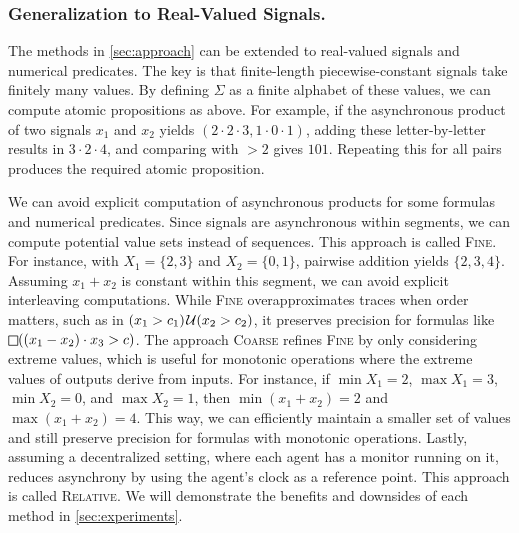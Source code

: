 \vspace{-1em}
\subsubsection{Generalization to Real-Valued Signals.}
The methods in \cref{sec:approach} can be extended to real-valued signals and numerical predicates.
The key is that finite-length piecewise-constant signals take finitely many values.
By defining $\Sigma$ as a finite alphabet of these values, we can compute atomic propositions as above.
For example, if the asynchronous product of two signals $x_1$ and $x_2$ yields $(2\cdot2\cdot3, 1\cdot0\cdot1)$, adding these letter-by-letter results in $3 \cdot 2 \cdot 4$, and comparing with $> 2$ gives $101$. Repeating this for all pairs produces the required atomic proposition.

We can avoid explicit computation of asynchronous products for some formulas and numerical predicates.
Since signals are asynchronous within segments, we can compute potential value sets instead of sequences.
This approach is called \textsc{Fine}.
For instance, with $X_1 = \{2,3\}$ and $X_2 = \{0,1\}$, pairwise addition yields $\{2, 3, 4\}$.
Assuming $x_1 + x_2$ is constant within this segment, we can avoid explicit interleaving computations.
While \textsc{Fine} overapproximates traces when order matters, such as in $(x_1 > c_1) \kern.1em\mathcal{U} (x_2 > c_2)$, it preserves precision for formulas like $\LTLalways((x_1 - x_2) \cdot x_3 > c)$.
The approach \textsc{Coarse} refines \textsc{Fine} by only considering extreme values, which is useful for monotonic operations where the extreme values of outputs derive from inputs.
For instance, if $\min X_1 = 2$, $\max X_1 = 3$, $\min X_2 = 0$, and $\max X_2 = 1$, then $\min(x_1 + x_2) = 2$ and $\max(x_1 + x_2) = 4$.
This way, we can efficiently maintain a smaller set of values and still preserve precision for formulas with monotonic operations.
Lastly, assuming a decentralized setting, where each agent has a monitor running on it, reduces asynchrony by using the agent's clock as a reference point.
This approach is called \textsc{Relative}.
We will demonstrate the benefits and downsides of each method in \cref{sec:experiments}.

\vspace{-1em}
